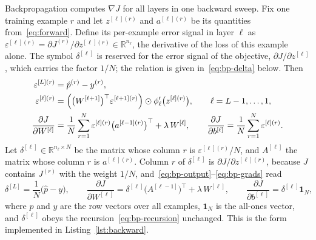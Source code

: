 Backpropagation computes $\nabla J$ for all layers in one backward sweep. Fix one training example $r$ and let $z^{[\ell](r)}$ and $a^{[\ell](r)}$ be its quantities from~\eqref{eq:forward}. Define its per-example error signal in layer $\ell$ as $\varepsilon^{[\ell](r)}=\partial J^{(r)}/\partial z^{[\ell](r)}\in\mathbb{R}^{n_\ell}$, the derivative of the loss of this example alone. The symbol $\delta^{[\ell]}$ is reserved for the error signal of the objective, $\partial J/\partial z^{[\ell]}$, which carries the factor $1/N$; the relation is given in~\eqref{eq:bp-delta} below. Then
\begin{align}
  \varepsilon^{[L](r)}&=\hat p^{(r)}-y^{(r)},
  \label{eq:bp-output}\\
  \varepsilon^{[\ell](r)}&=\Bigl(\bigl(W^{[\ell+1]}\bigr)^{\top}\varepsilon^{[\ell+1](r)}\Bigr)\odot\phi_\ell'\bigl(z^{[\ell](r)}\bigr),\qquad \ell=L-1,\dots,1,
  \label{eq:bp-recursion}\\
  \frac{\partial J}{\partial W^{[\ell]}}&=\frac{1}{N}\sum_{r=1}^{N}\varepsilon^{[\ell](r)}\bigl(a^{[\ell-1](r)}\bigr)^{\top}+\lambda\,W^{[\ell]},\qquad
  \frac{\partial J}{\partial b^{[\ell]}}=\frac{1}{N}\sum_{r=1}^{N}\varepsilon^{[\ell](r)} .
  \label{eq:bp-grads}
\end{align}
Let $\delta^{[\ell]}\in\mathbb{R}^{n_\ell\times N}$ be the matrix whose column $r$ is $\varepsilon^{[\ell](r)}/N$, and $A^{[\ell]}$ the matrix whose column $r$ is $a^{[\ell](r)}$. Column $r$ of $\delta^{[\ell]}$ is $\partial J/\partial z^{[\ell](r)}$, because $J$ contains $J^{(r)}$ with the weight $1/N$, and~\eqref{eq:bp-output}--\eqref{eq:bp-grads} read
\begin{equation}
  \delta^{[L]}=\frac{1}{N}\bigl(\hat p-y\bigr),\qquad
  \frac{\partial J}{\partial W^{[\ell]}}=\delta^{[\ell]}\bigl(A^{[\ell-1]}\bigr)^{\top}+\lambda\,W^{[\ell]},\qquad
  \frac{\partial J}{\partial b^{[\ell]}}=\delta^{[\ell]}\mathbf{1}_N,
  \label{eq:bp-delta}
\end{equation}
where $\hat p$ and $y$ are the row vectors over all examples, $\mathbf{1}_N$ is the all-ones vector, and $\delta^{[\ell]}$ obeys the recursion~\eqref{eq:bp-recursion} unchanged. This is the form implemented in Listing~\ref{lst:backward}.

